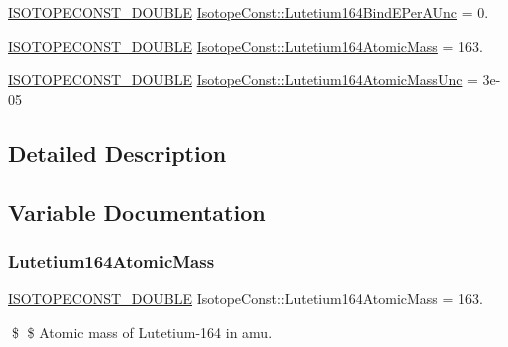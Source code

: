 \begin{DoxyCompactItemize}
\mbox{\hyperlink{group___isotope_const-_macros_ga8f45a7272ce02c0b4c65c44636ed719a}{I\+S\+O\+T\+O\+P\+E\+C\+O\+N\+S\+T\+\_\+\+D\+O\+U\+B\+LE}} \mbox{\hyperlink{group___isotope_const-_lutetium-_lu164_ga334d51651eb4495b1b8f706b1bf25ed9}{Isotope\+Const\+::\+Lutetium164\+Bind\+E\+Per\+A\+Unc}} = 0.
\item 
\mbox{\hyperlink{group___isotope_const-_macros_ga8f45a7272ce02c0b4c65c44636ed719a}{I\+S\+O\+T\+O\+P\+E\+C\+O\+N\+S\+T\+\_\+\+D\+O\+U\+B\+LE}} \mbox{\hyperlink{group___isotope_const-_lutetium-_lu164_ga2e5f0d73af2d3d3f67209cdce87f5011}{Isotope\+Const\+::\+Lutetium164\+Atomic\+Mass}} = 163.
\item 
\mbox{\hyperlink{group___isotope_const-_macros_ga8f45a7272ce02c0b4c65c44636ed719a}{I\+S\+O\+T\+O\+P\+E\+C\+O\+N\+S\+T\+\_\+\+D\+O\+U\+B\+LE}} \mbox{\hyperlink{group___isotope_const-_lutetium-_lu164_ga7e502f8d6ef8fb6af283a7c3f818ec28}{Isotope\+Const\+::\+Lutetium164\+Atomic\+Mass\+Unc}} = 3e-\/05
\end{DoxyCompactItemize}


\subsection{Detailed Description}


\subsection{Variable Documentation}
\mbox{\label{group___isotope_const-_lutetium-_lu164_ga2e5f0d73af2d3d3f67209cdce87f5011}} 
\subsubsection{\texorpdfstring{Lutetium164\+Atomic\+Mass}{Lutetium164AtomicMass}}
{\footnotesize\ttfamily \mbox{\hyperlink{group___isotope_const-_macros_ga8f45a7272ce02c0b4c65c44636ed719a}{I\+S\+O\+T\+O\+P\+E\+C\+O\+N\+S\+T\+\_\+\+D\+O\+U\+B\+LE}} Isotope\+Const\+::\+Lutetium164\+Atomic\+Mass = 163.}

\$ \$ Atomic mass of Lutetium-\/164 in amu. \mbox{\label{group___isotope_const-_lutetium-_lu164_ga7e502f8d6ef8fb6af283a7c3f818ec28}} 
